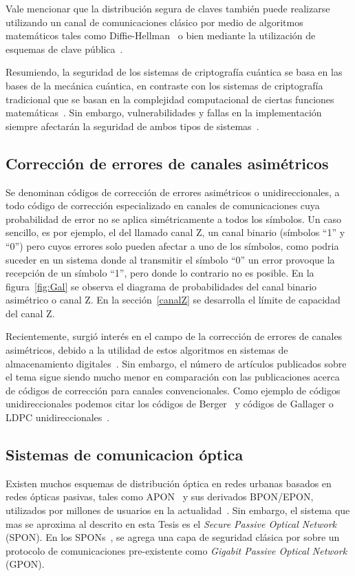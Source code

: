 Vale mencionar que la distribución segura de claves también puede realizarse utilizando un canal de comunicaciones clásico por medio de algoritmos matemáticos tales como Diffie-Hellman~\cite{diffie1976new} o bien mediante la utilización de esquemas de clave pública~\cite{kohnfelder1978towards}.

Resumiendo, la seguridad de los sistemas de criptografía cuántica se basa en las bases de la mecánica cuántica, en contraste con los sistemas de criptografía tradicional que se basan en la complejidad computacional de ciertas funciones matemáticas~\cite{kohnfelder1978towards}. Sin embargo, vulnerabilidades y fallas en la implementación siempre afectarán la seguridad de ambos tipos de sistemas~\cite{lydersen2010hacking}.


\subsection{Corrección de errores de canales asimétricos}
 
Se denominan códigos de corrección de errores asimétricos o unidireccionales, a todo código de corrección especializado en canales de comunicaciones cuya probabilidad de error no se aplica simétricamente a todos los símbolos. Un caso sencillo, es por ejemplo, el del llamado canal Z, un canal binario (símbolos ``1'' y ``0'') pero cuyos errores solo pueden afectar a uno de los símbolos, como podria suceder en un sistema donde al transmitir el símbolo ``0'' un error provoque la recepción de un símbolo ``1'', pero donde lo contrario no es posible. En la figura~\ref{fig:Gal} se observa el diagrama de probabilidades del canal binario asimétrico o canal Z. En la sección~\ref{canalZ} se desarrolla el límite de capacidad del canal Z.

Recientemente, surgió interés en el campo de la corrección de errores de canales asimétricos, debido a la utilidad de estos algoritmos en sistemas de almacenamiento digitales~\cite{tanakamaru201195}. Sin embargo, el número de artículos publicados sobre el tema sigue siendo mucho menor en comparación con las publicaciones acerca de códigos de corrección para canales convencionales. Como ejemplo de códigos unidireccionales podemos citar los códigos de Berger~\cite{berger1961note} y códigos de Gallager o LDPC unidireccionales~\cite{neri2008gallager}.

\subsection{Sistemas de comunicacion óptica}
\label{defPON}
Existen muchos esquemas de distribución óptica en redes urbanas basados en redes ópticas pasivas, tales como APON~\cite{kramer2002ethernet} y sus derivados BPON/EPON, utilizados por millones de usuarios en la actualidad~\cite{chanclou2013france}.
Sin embargo, el sistema que mas se aproxima al descrito en esta Tesis es el \textit{Secure Passive Optical Network} (SPON). En los SPONs~\cite{armoredshield}, se agrega una capa de seguridad clásica por sobre un protocolo de comunicaciones pre-existente como \textit{Gigabit Passive Optical Network} (GPON).

